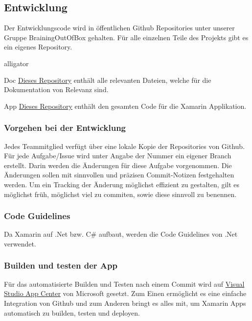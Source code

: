 \subsection{Entwicklung}
Der Entwicklungscode wird in öffentlichen Github Repositories unter unserer Gruppe BrainingOutOfBox gehalten. Für alle einzelnen Teile des Projekts gibt es ein eigenes Repository.

\begin{labeling}{alligator}
\item [Doc] \href{https://github.com/BrainingOutOfBox/Doc}{Dieses Repository} enthält alle relevanten Dateien, welche für die Dokumentation von Relevanz sind.
\item [App] \href{https://github.com/BrainingOutOfBox/Doc}{Dieses Repository} enthält den gesamten Code für die Xamarin Applikation.
\end{labeling}

\subsubsection*{Vorgehen bei der Entwicklung}
Jedes Teammitglied verfügt über eine lokale Kopie der Repositories von Github. Für jede Aufgabe/Issue wird unter Angabe der Nummer ein eigener Branch erstellt. Darin werden die Änderungen für diese Aufgabe vorgenommen. Die Änderungen sollen mit sinnvollen und präzisen Commit-Notizen festgehalten werden. Um ein Tracking der Änderung möglichst effizient zu gestalten, gilt es möglichst früh, möglichst viel zu commiten, sowie diese sinnvoll zu benennen.

\subsubsection*{Code Guidelines}
Da Xamarin auf .Net bzw. C\# aufbaut, werden die Code Guidelines von .Net verwendet. \cite{guidelines-DotNet}

\subsubsection*{Builden und testen der App}
Für das automatisierte Builden und Testen nach einem Commit wird auf \href{https://appcenter.ms/orgs/BrainingOutOfBox/apps/BrainingOutOfBox-App}{Visual Studio App Center} von Microsoft gesetzt. Zum Einen ermöglicht es eine einfache Integration von Github und zum Anderen bringt es alles mit, um Xamarin Apps automatisch zu builden, testen und deployen. 

